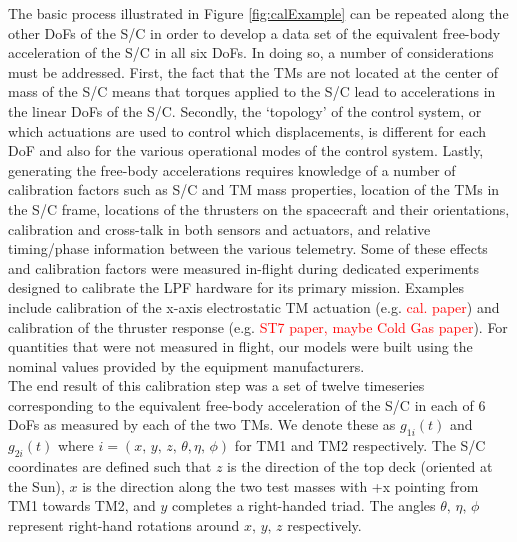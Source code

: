 \documentclass[twocolumn, trackchanges]{aastex62}
\newcommand{\red}[1]{\textcolor{red}{#1}}
\begin{document}
The basic process illustrated in Figure \ref{fig:calExample} can be repeated along the other DoFs of the S/C in order to develop a data set of the equivalent free-body acceleration of the S/C in all six DoFs. In doing so, a number of considerations must be addressed. First, the fact that the TMs are not located at the center of mass of the S/C means that torques applied to the S/C lead to accelerations in the linear DoFs of the S/C.  Secondly, the `topology' of the control system, or which actuations are used to control which displacements, is different for each DoF and also for the various operational modes of the control system. Lastly, generating the free-body accelerations requires knowledge of a number of calibration factors such as S/C and TM mass properties, location of the TMs in the S/C frame, locations of the thrusters on the spacecraft and their orientations, calibration and cross-talk in both sensors and actuators, and relative timing/phase information between the various telemetry.  Some of these effects and calibration factors were measured in-flight during dedicated experiments designed to calibrate the LPF hardware for its primary mission. Examples include calibration of the x-axis electrostatic TM actuation (e.g. \red{cal. paper}) and calibration of the thruster response (e.g. \red{ST7 paper, maybe Cold Gas paper}). For quantities that were not measured in flight, our models were built using the nominal values provided by the equipment manufacturers. 
\\
The end result of this calibration step was a set of twelve timeseries corresponding to the equivalent free-body acceleration of the S/C in each of 6 DoFs as measured by each of the two TMs. We denote these as $g_{1i}(t)$ and $g_{2i}(t)$ where $i=\left(x,\,y,\,z,\,\theta,\eta,\,\phi\right)$ for TM1 and TM2 respectively. The S/C coordinates are defined such that $z$ is the direction of the top deck (oriented at the Sun), $x$ is the direction along the two test masses with +x pointing from TM1 towards TM2, and $y$ completes a right-handed triad. The angles $\theta,\,\eta,\,\phi$ represent right-hand rotations around $x,\,y,\,z$ respectively.
\end{document}
